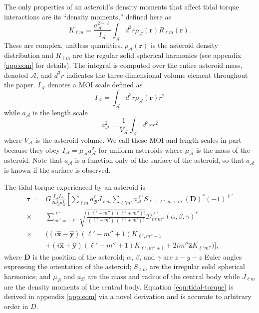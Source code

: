 \documentclass[fleqn,usenatbib]{mnras}
\renewcommand{\unit}[1]{\bm{\hat{#1}}}
\begin{document}
The only properties of an asteroid's density moments that affect tidal torque interactions are its ``density moments,'' defined here as
\begin{equation}
  K_{\ell m} = \frac{a_\mathcal{A}^{2-\ell}}{I_\mathcal{A}} \int_\mathcal{A} d^3 r \rho_\mathcal{A}(\bm r) R_{\ell m}(\bm r).
  \label{eqn:klm}
\end{equation}
These are complex, unitless quantities. $\rho_\mathcal{A}(\bm r)$ is the asteroid density distribution and $R_{\ell m}$ are the regular solid spherical harmonics (see appendix \ref{app:eom} for details). The integral is computed over the entire asteroid mass, denoted $\mathcal{A}$, and $d^3 r$ indicates the three-dimensional volume element throughout the paper. $I_\mathcal{A}$ denotes a MOI scale defined as 
\begin{equation}
  I_\mathcal{A} = \int_\mathcal{A} d^3 r \rho_\mathcal{A}(\bm r) r^2
  \label{eqn:ia}
\end{equation}
while $a_\mathcal{A}$ is the length scale
\begin{equation}
  a_\mathcal{A}^2 = \frac{1}{V_\mathcal{A}} \int_\mathcal{A} d^3 r r^2
  \label{eqn:aa}
\end{equation}
where $V_\mathcal{A}$ is the asteroid volume. We call these MOI and length scales in part because they obey $I_\mathcal{A} = \mu_\mathcal{A} a_\mathcal{A}^2$ for uniform asteroids where $\mu_\mathcal{A}$ is the mass of the asteroid. Note that $a_\mathcal{A}$ is a function only of the surface of the asteroid, so that $a_\mathcal{A}$ is known if the surface is observed.

The tidal torque experienced by an asteroid is 
\begin{equation}
  \begin{split}
  \bm \tau = & G\frac{I_\mathcal{A}I_\mathcal{B}}{2 a_\mathcal{A}^2a_\mathcal{B}^2}\left[\sum_{\ell m} a_\mathcal{B}^\ell J_{\ell m} \sum_{\ell' m'}a_\mathcal{A}^{\ell'}S_{\ell+\ell', m + m'} (\bm D)^* (-1)^{\ell'}\right.\\
  \times & \left.\sum_{m''=-\ell'}^{\ell'} \sqrt{\frac{(\ell'-m'')!(\ell'+m'')!}{(\ell'-m')!(\ell'+m')!}}  \mathcal{D}^{\ell'}_{m'm''}(\alpha, \beta, \gamma)^* \right. \\
  \times & \Big((i\unit x - \unit y)(\ell'-m''+1)K_{\ell',m''-1} \\
  & +(i\unit x+\unit y)(\ell'+m''+1)K_{\ell',m''+1}+2im''\unit z K_{\ell'm''}\Big) \Bigg],
  \end{split}
  \label{eqn:tidal-torque}
\end{equation}
where $\bm D$ is the position of the asteroid; $\alpha$, $\beta$, and $\gamma$ are $z-y-z$ Euler angles expressing the orientation of the asteroid; $S_{\ell m}$ are the irregular solid spherical harmonics; and $\mu_\mathcal{B}$ and $a_\mathcal{B}$ are the mass and radius of the central body while $J_{\ell m}$ are the density moments of the central body. Equation \ref{eqn:tidal-torque} is derived in appendix \ref{app:eom} via a novel derivation and is accurate to arbitrary order in $D$.
\end{document}
